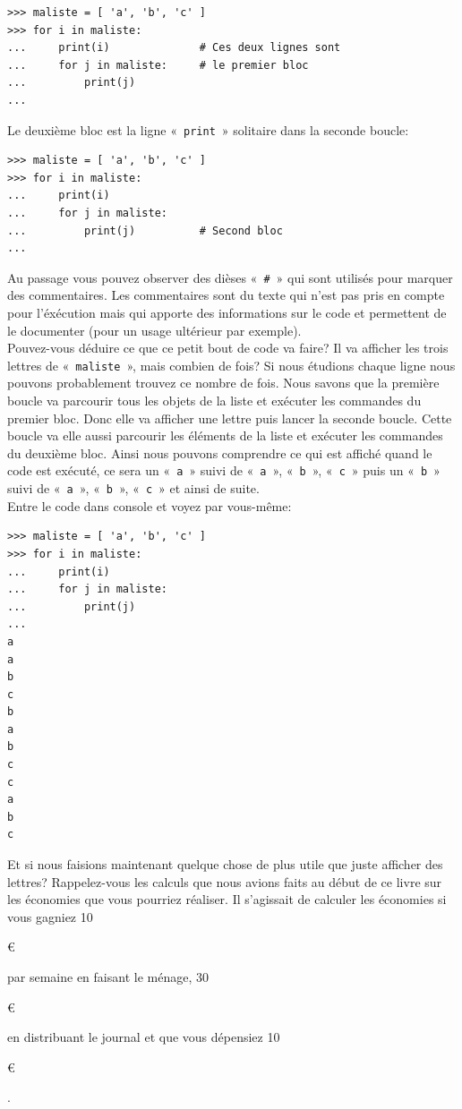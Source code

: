\begin{Verbatim}[frame=single,rulecolor=\color{gray}, label=ne pas saisir]
>>> maliste = [ 'a', 'b', 'c' ]
>>> for i in maliste:
...     print(i)              # Ces deux lignes sont
...     for j in maliste:     # le premier bloc
...         print(j)
...
\end{Verbatim}

Le deuxième bloc est la ligne «~\texttt{print}~» solitaire dans la seconde boucle:

\begin{Verbatim}[frame=single,rulecolor=\color{gray}, label=ne pas saisir]
>>> maliste = [ 'a', 'b', 'c' ]
>>> for i in maliste:
...     print(i) 
...     for j in maliste:
...         print(j)          # Second bloc
...
\end{Verbatim}

Au passage vous pouvez observer des dièses «~\texttt{\#}~» qui sont utilisés pour marquer des commentaires. Les commentaires sont du texte qui n'est pas pris en compte pour l'éxécution mais qui apporte des informations sur le code et permettent de le documenter (pour un usage ultérieur par exemple).\\


Pouvez-vous déduire ce que ce petit bout de code va faire?
Il va afficher les trois lettres de «~\texttt{maliste}~», mais combien de fois?
Si nous étudions chaque ligne nous pouvons probablement trouvez ce nombre de fois.
Nous savons que la première boucle va parcourir tous les objets de la liste et exécuter
les commandes du premier bloc. Donc elle va afficher une lettre puis lancer la seconde boucle. Cette boucle va elle aussi parcourir les éléments de la liste et exécuter les commandes du deuxième bloc. Ainsi nous pouvons comprendre ce qui est affiché quand le code est exécuté, ce sera un «~\texttt{a}~»  suivi de «~\texttt{a}~», «~\texttt{b}~», «~\texttt{c}~» puis un «~\texttt{b}~»  suivi de «~\texttt{a}~», «~\texttt{b}~», «~\texttt{c}~» et ainsi de suite.\\

Entre le code dans console et voyez par vous-même:

\begin{Verbatim}[frame=single,rulecolor=\color{green}, label=à saisir avec attention]
>>> maliste = [ 'a', 'b', 'c' ]
>>> for i in maliste:
...     print(i)
...     for j in maliste:
...         print(j)
...
a
a
b
c
b
a
b
c
c
a
b
c
\end{Verbatim}

Et si nous faisions maintenant quelque chose de plus utile que juste afficher des lettres?
Rappelez-vous les calculs que nous avions faits au début de ce livre sur les économies que vous pourriez réaliser. Il s'agissait de calculer les économies si vous gagniez 10\begin{small}\euro\end{small} par semaine en faisant le ménage, 30\begin{small}\euro\end{small} en distribuant le journal et que vous dépensiez 10\begin{small}\euro\end{small}.\\

